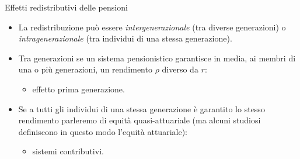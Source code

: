 \documentclass[aspectratio=64,12pt]{beamer}
\begin{document}
\begin{frame}{Effetti redistributivi delle pensioni}
\begin{itemize}
\item La redistribuzione può essere \emph{intergenerazionale} (tra diverse generazioni)
o \emph{intragenerazionale} (tra individui di una stessa generazione).
\item Tra generazioni se un sistema pensionistico garantisce \alert{in media},
  ai membri di una o più generazioni, un rendimento $\rho$ diverso da $r$:
\begin{itemize}
\item \alert{effetto prima generazione}.
\end{itemize}
\item Se a tutti gli individui di una stessa generazione è garantito lo stesso
  rendimento parleremo di \alert{equità quasi-attuariale} (ma alcuni studiosi
  definiscono in questo modo l'equità attuariale):
\begin{itemize}
\item sistemi contributivi.
\end{itemize}
\end{itemize}
\end{frame}
\end{document}
